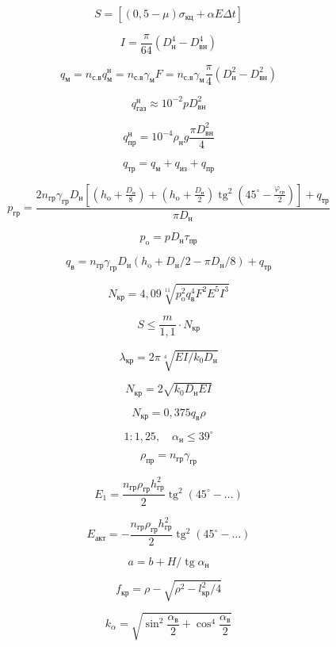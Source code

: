 $$ S = [(0{,}5 - \mu)\sigma_{\text{кц}} + \alpha E \Delta t] $$

$$ I = \frac{\pi}{64} \left( D_{\text{н}}^4 - D_{\text{вн}}^4 \right) $$

$$ q_{\text{м}} = n_{\text{с.в}} q_{\text{м}}^{\text{н}} = n_{\text{с.в}} \gamma_{\text{м}} F = n_{\text{с.в}} \gamma_{\text{м}} \frac{\pi}{4} \left( D_{\text{н}}^2 - D_{\text{вн}}^2 \right) $$

$$ q_{\text{газ}}^{\text{н}} \approx 10^{-2} p D_{\text{вн}}^2 $$

$$ q_{\text{пр}}^{\text{н}} = 10^{-4} \rho_{\text{н}} g \frac{\pi D_{\text{вн}}^2}{4} $$

$$ q_{\text{тр}} = q_{\text{м}} + q_{\text{из}} + q_{\text{пр}} $$

$$ p_{\text{гр}} = \frac{2 n_{\text{гр}} \gamma_{\text{гр}} D_{\text{н}} \left[ \left( h_{\text{o}} + \frac{D_{\text{н}}}{8} \right) + \left( h_{\text{o}} + \frac{D_{\text{н}}}{2} \right) \operatorname{tg}^2 \left( 45^{\circ} - \frac{\varphi_{\text{гр}}}{2} \right) \right] + q_{\text{тр}}}{\pi D_{\text{н}}} $$

$$ p_{\text{o}} = p D_{\text{н}} \tau_{\text{пр}} $$

$$ q_{\text{в}} = n_{\text{гр}} \gamma_{\text{гр}} D_{\text{н}} (h_{\text{o}} + D_{\text{н}}/2 - \pi D_{\text{н}}/8) + q_{\text{тр}} $$

$$ N_{\text{кр}} = 4{,}09 \sqrt[11]{p_{\text{o}}^2 q_{\text{в}}^4 F^2 E^5 I^3} $$

$$ S \le \frac{m}{1{,}1} \cdot N_{\text{кр}} $$

$$ \lambda_{\text{кр}} = 2\pi \sqrt[4]{EI / k_0 D_{\text{н}}} $$

$$ N_{\text{кр}} = 2 \sqrt{k_0 D_{\text{н}} EI} $$

$$ N_{\text{кр}} = 0{,}375 q_{\text{в}} \rho $$

$$ 1 : 1{,}25, \quad \alpha_{\text{н}} \le 39^{\circ} $$

$$ \rho_{\text{пр}} = n_{\text{гр}} \gamma_{\text{гр}} $$

$$ E_1 = \frac{n_{\text{гр}} \rho_{\text{гр}} h_{\text{гр}}^2}{2} \operatorname{tg}^2(45^{\circ} - \dots) $$

$$ E_{\text{акт}} = - \frac{n_{\text{гр}} \rho_{\text{гр}} h_{\text{гр}}^2}{2} \operatorname{tg}^2(45^{\circ} - \dots) $$

$$ a = b + H/\operatorname{tg} \alpha_{\text{н}} $$

$$ f_{\text{кр}} = \rho - \sqrt{\rho^2 - l_{\text{кр}}^2 / 4} $$

$$ k_{\alpha} = \sqrt{\sin^2 \frac{\alpha_{\text{в}}}{2} + \cos^4 \frac{\alpha_{\text{в}}}{2}} $$
